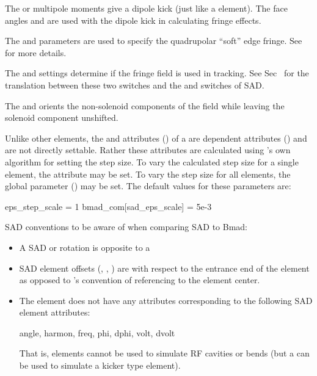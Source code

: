 {The  or  multipole moments give a dipole kick (just like a  element). The
face angles  and  are used with the dipole kick in calculating fringe effects.

The  and  parameters are used to specify the quadrupolar ``soft'' edge fringe. See
 for more details.

The  and  settings determine if the fringe field is used in
tracking. See Sec~ for the translation between these two switches and the 
and  switches of SAD.

The  and  orients the non-solenoid components of the field while
leaving the solenoid component unshifted.

Unlike other elements, the  and  attributes () of a
 are dependent attributes () and are not directly settable. Rather these
attributes are calculated using 's own algorithm for setting the step size. To vary the
calculated step size for a single  element, the attribute  may be
set.  To vary the step size for all  elements, the global parameter
 () may be set.  The default values for these
parameters are:
\begin{example}
  eps_step_scale          = 1
  bmad_com[sad_eps_scale] = 5e-3
\end{example}

SAD conventions to be aware of when comparing SAD to Bmad:
\begin{itemize}
\item
A SAD  or  rotation is opposite to a \bmad {}
\item
SAD element offsets (, , ) are with respect to the entrance end of the element
as opposed to \bmad's convention of referencing to the element center.
\item
  The \bmad {} element does not have any attributes corresponding to the following
SAD  element attributes:
\vspace{1.0ex}
\begin{example}
  angle, harmon, freq, phi, dphi, volt, dvolt
\end{example}
\vspace{1.0ex}
That is,  elements cannot be used to simulate RF cavities or bends (but a 
can be used to simulate a kicker type element).
\end{itemize}

}
